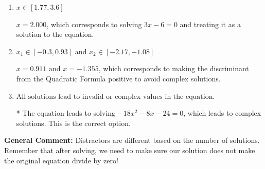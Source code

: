 \documentclass{extbook}[14pt]
\begin{document}
\begin{enumerate}
{\begin{enumerate}[label=\Alph*.]
$x = -1.000$, which corresponds to solving $-4x -4 = 0$ and treating it as a solution to the equation.
\item \( x \in [1.77,3.6] \)

$x = 2.000$, which corresponds to solving $3x -6 = 0$ and treating it as a solution to the equation.
\item \( x_1 \in [-0.3, 0.93] \text{ and } x_2 \in [-2.17,-1.08] \)

$x = 0.911 \text{ and } x = -1.355$, which corresponds to making the discriminant from the Quadratic Formula positive to avoid complex solutions.
\item \( \text{All solutions lead to invalid or complex values in the equation.} \)

* The equation leads to solving $-18x^{2} -8 x -24=0$, which leads to complex solutions. This is the correct option.
\end{enumerate}

\textbf{General Comment:} Distractors are different based on the number of solutions. Remember that after solving, we need to make sure our solution does not make the original equation divide by zero!
}
\end{enumerate}
\end{document}

